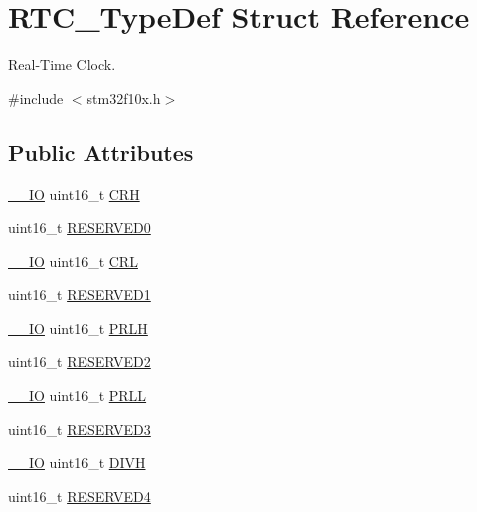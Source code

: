 \hypertarget{struct_r_t_c___type_def}{}\section{R\+T\+C\+\_\+\+Type\+Def Struct Reference}
\label{struct_r_t_c___type_def}


Real-\/\+Time Clock.  




{\ttfamily \#include $<$stm32f10x.\+h$>$}

\subsection*{Public Attributes}
\begin{DoxyCompactItemize}
\item 
\hyperlink{core__sc300_8h_aec43007d9998a0a0e01faede4133d6be}{\+\_\+\+\_\+\+IO} uint16\+\_\+t \hyperlink{struct_r_t_c___type_def_aad5162f4b5b15deb174479e8e543db82}{C\+RH}
\item 
uint16\+\_\+t \hyperlink{struct_r_t_c___type_def_a6d55bb337c409f849725a774364ce3bc}{R\+E\+S\+E\+R\+V\+E\+D0}
\item 
\hyperlink{core__sc300_8h_aec43007d9998a0a0e01faede4133d6be}{\+\_\+\+\_\+\+IO} uint16\+\_\+t \hyperlink{struct_r_t_c___type_def_a95b9e1ed044a4e1cc3632326e7250767}{C\+RL}
\item 
uint16\+\_\+t \hyperlink{struct_r_t_c___type_def_a8a152da628dbdba2e849adf196fa341a}{R\+E\+S\+E\+R\+V\+E\+D1}
\item 
\hyperlink{core__sc300_8h_aec43007d9998a0a0e01faede4133d6be}{\+\_\+\+\_\+\+IO} uint16\+\_\+t \hyperlink{struct_r_t_c___type_def_a831b0b55bae7921faa7d16c6f3160449}{P\+R\+LH}
\item 
uint16\+\_\+t \hyperlink{struct_r_t_c___type_def_aaa77e68ac9af2be5c095c05a50efe2e4}{R\+E\+S\+E\+R\+V\+E\+D2}
\item 
\hyperlink{core__sc300_8h_aec43007d9998a0a0e01faede4133d6be}{\+\_\+\+\_\+\+IO} uint16\+\_\+t \hyperlink{struct_r_t_c___type_def_a03cf96aff11c288096d30a66afd19899}{P\+R\+LL}
\item 
uint16\+\_\+t \hyperlink{struct_r_t_c___type_def_a5489f7c3119b8e7b55d77a465baf223a}{R\+E\+S\+E\+R\+V\+E\+D3}
\item 
\hyperlink{core__sc300_8h_aec43007d9998a0a0e01faede4133d6be}{\+\_\+\+\_\+\+IO} uint16\+\_\+t \hyperlink{struct_r_t_c___type_def_a224b675d0ecad8b6e26d9e4c32691a18}{D\+I\+VH}
\item 
uint16\+\_\+t \hyperlink{struct_r_t_c___type_def_ae77864629c9ae9768a752e045c44833d}{R\+E\+S\+E\+R\+V\+E\+D4}

\end{DoxyCompactItemize}

